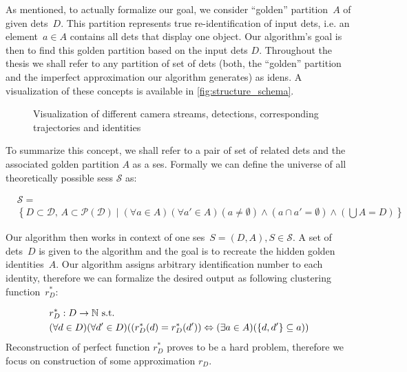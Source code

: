 As mentioned, to actually formalize our goal, we consider ``golden'' partition~$A$ of given \glspl{det}~$D$. This partition represents true re-identification of input \glspl{det}, i.e. an element~$a \in A$ contains all \glspl{det} that display one object. Our algorithm's goal is then to find this golden partition based on the input \glspl{det} $D$. Throughout the thesis we shall refer to any partition of set of \glspl{det} (both, the ``golden'' partition and the imperfect approximation our algorithm generates) as \glspl{iden}. A visualization of these concepts is available in \autoref{fig:structure_schema}.


\begin{figure}
    \centering
    \def\svgwidth{\textwidth}
    
    \caption{Visualization of different camera streams, detections, corresponding trajectories and identities}
    \label{fig:structure_schema}
\end{figure}



To summarize this concept, we shall refer to a pair of set of related \glspl{det} and the associated golden partition $A$ as a \gls{ses}. Formally we can define the universe of all theoretically possible \glspl{ses} $\mathcal{S}$ as:

\begin{equation*}
\begin{split}
&\mathcal{S} =\\& \left\{D \subset \mathcal{D},\,A \subset \mathcal{P(D)} \mid (\forall a \in A) (\forall a' \in A) (a \neq \emptyset) \land (a \cap a' = \emptyset) \land \left(\bigcup A = D\right)\right\}    
\end{split}
\end{equation*}


Our algorithm then works in context of one \gls{ses}~$S = (D, A), S \in \mathcal{S}$. A set of \glspl{det}~$D$ is given to the  algorithm and the goal is to recreate the hidden golden identities~$A$. Our algorithm assigns arbitrary identification number to each identity, therefore we can formalize the desired output as following clustering function~$r_D^*$:

\begin{equation}
\begin{split}
&r_D^*: D \rightarrow \mathbb{N} \text{ s.t. }\\
&(\forall d \in D) (\forall d' \in D) ((r_D^*(d) = r_D^*(d')) \Leftrightarrow (\exists a \in A) (\{d, d'\} \subseteq a))
\label{eq:reidentification}
\end{split}
\end{equation}
Reconstruction of perfect function $r_D^*$ proves to be a hard problem, 
therefore we focus on construction of some approximation $r_D$.

